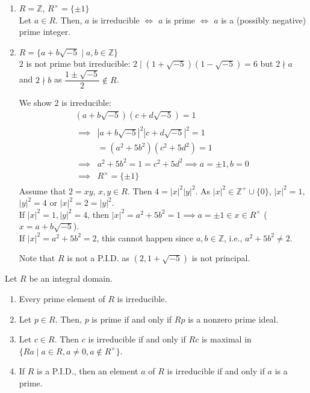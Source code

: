 \documentclass[twoside]{article}
\newcommand\Z{\mathbb Z}
\theoremstyle{remark}
\begin{document}
\begin{examples}\phantom{}
  \begin{enumerate}[label=\arabic*.]
    \item \(R = \Z\), \(R^\times = \{\pm 1\}\) \\
    Let \(a \in R\). Then, \(a\) is irreducible \(\iff\) \(a\) is prime \(\iff\) \(a\) is a (possibly negative) prime integer.
    \item \(R = \{a + b \sqrt{-5} \mid a,b \in \Z\}\) \\
    \(2\) is not prime but irreducible: \(2 \mid (1+\sqrt{-5}) (1-\sqrt{-5}) = 6\) but \(2 \nmid a\) and \(2 \nmid b\) as \(\dfrac{1\pm\sqrt{-5}}2 \notin R\). \par
    We show \(2\) is irreducible:
    \begin{gather*}
      (a+b\sqrt{-5})(c+d\sqrt{-5}) = 1 \\
      \begin{aligned}
        \implies & |a+b\sqrt{-5}|^2 |c+d\sqrt{-5}|^2 = 1 \\
        & = (a^2+5b^2) (c^2+5d^2) = 1 \\
        \implies & a^2+5b^2 = 1 = c^2+5d^2 \implies a = \pm 1, b = 0 \\
        \implies & R^\times = \{\pm 1\}
      \end{aligned}
    \end{gather*}
    Assume that \(2 = xy\), \(x,y \in R\). Then \(4 = |x|^2 |y|^2\). As \(|x|^2 \in \Z^+ \cup \{0\}\), \(|x|^2 = 1\), \(|y|^2 = 4\) or \(|x|^2 = 2 = |y|^2\). \\
    If \(|x|^2 = 1, |y|^2 = 4\), then \(|x|^2 = a^2+5b^2 = 1 \implies a = \pm1 \in x \in R^\times\) (\(x = a + b\sqrt{-5}\)). \\
    If \(|x|^2 = a^2 + 5b^2 = 2\), this cannot happen since \(a,b \in \Z\), i.e., \(a^2+5b^2 \neq 2\). \par
    Note that \(R\) is not a P.I.D. as \((2, 1+\sqrt{-5})\) is not principal.
  \end{enumerate}
\end{examples}

\begin{lemma}
  Let \(R\) be an integral domain.
  \begin{enumerate}[label=\textup{(\arabic*)}, nosep]
    \item Every prime element of \(R\) is irreducible.
    \item Let \(p \in R\). Then, \(p\) is prime if and only if \(Rp\) is a nonzero prime ideal.
    \item Let \(c \in R\). Then \(c\) is irreducible if and only if \(Rc\) is maximal in \(\{Ra \mid a \in R, a \neq 0, a \notin R^\times\}\).
    \item If \(R\) is a P.I.D., then an element \(a\) of \(R\) is irreducible if and only if \(a\) is a prime.
  \end{enumerate}
\end{lemma}
\end{document}
